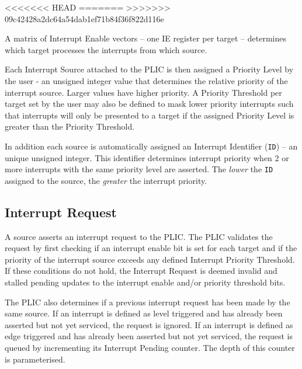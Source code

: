 <<<<<<< HEAD
=======
>>>>>>> 09c42428a2dc64a54dab1ef71b84f36f822d116e

A matrix of Interrupt Enable vectors -- one IE register per target --
determines which target processes the interrupts from which source.

Each Interrupt Source attached to the PLIC is then assigned a Priority
Level by the user - an unsigned integer value that determines the relative priority of
the interrupt source. Larger values have higher priority. A Priority Threshold 
per target set by the user may also be defined to mask lower priority interrupts such that 
interrupts will only be presented to a target if the assigned Priority Level 
is greater than the Priority Threshold.

In addition each source is automatically assigned an Interrupt Identifier
(\texttt{ID}) -- an unique unsigned integer. This identifier determines
interrupt priority when 2 or more interrupts with the same priority
level are asserted. The \emph{lower} the \texttt{ID} assigned to the source,
the \emph{greater} the interrupt priority.

\subsection{Interrupt Request}

A source asserts an interrupt request to the PLIC. The PLIC validates
the request by first checking if an interrupt enable bit is set for each
target and if the priority of the interrupt source exceeds any defined
Interrupt Priority Threshold. If these conditions do not hold, the
Interrupt Request is deemed invalid and stalled pending updates to the interrupt enable and/or priority threshold bits. 

The PLIC also determines if a previous interrupt request has been made by the same source.
If an interrupt is defined as level triggered and has already been asserted but not yet serviced, the request is ignored.
If an interrupt is defined as edge triggered and has already been asserted but not yet serviced, the request is queued by incrementing its Interrupt Pending counter.
The depth of this counter is parameterised.

